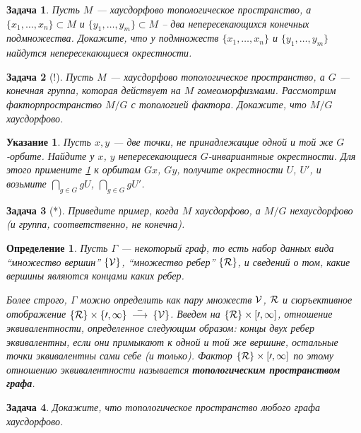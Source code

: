\documentclass[12pt]{book}
\newcommand{\arrow}{{\:\longrightarrow\:}}
\theoremstyle{upshape}
\newtheorem{zadacha}{Задача}[chapter]
\theoremstyle{generic}
\newtheorem{opredelenie}[teorema]{Определение}
\theoremstyle{upshapenonumber}
\newtheorem{ukazanie}{Указание}[section]
\newcommand{\следствие}{%
     \refstepcounter{teorema}
     {\noindent\bf Следствие \thechapter.\arabic{teorema}:\ }}
\newcommand{\пример}{%
     \refstepcounter{teorema}
     {\noindent\bf Пример \thechapter.\arabic{teorema}:\ }}
\newcommand{\лемма}{%
     \refstepcounter{teorema}
     {\noindent\bf Лемма \thechapter.\arabic{teorema}:\ }}
\newcommand{\теорема}{%
     \refstepcounter{teorema}
     {\noindent\bf Теорема \thechapter.\arabic{teorema}:\ }}
\newcommand{\утверждение}{%
     \refstepcounter{teorema}
     {\noindent\bf Утверждение \thechapter.\arabic{teorema}:\ }}
\begin{document}
{\begin{zadacha}\label{_hausdo_kone_Zadacha_}
Пусть $M$ --- хаусдорфово топологическое пространство,
а $\{x_1, \dots, x_n\} \subset M$ и $\{y_1, \dots, y_m\} \subset M$ 
-- два непересекающихся конечных подмножества. Докажите, что у 
подмножеств $\{x_1, \dots, x_n\}$ и  $\{y_1,\dots, y_m\}$ найдутся
непересекающиеся
окрестности. 
\end{zadacha}

\begin{zadacha}[!]
Пусть $M$ --- хаусдорфово  топологическое пространство, а 
$G$ --- конечная группа, которая действует на $M$
гомеоморфизмами. Рассмотрим
факторпространство $M/G$ с топологией
фактора. Докажите, что $M/G$ хаусдорфово.
\end{zadacha}

\begin{ukazanie}
Пусть $x,y$ --- две точки, не принадлежащие
одной и той же $G$-орбите. Найдите у $x$, $y$
непересекающиеся $G$-инвариантные окрестности. Для этого
примените \ref{_hausdo_kone_Zadacha_} к орбитам
$Gx$, $Gy$, получите окрестности $U$, $U'$,
и возьмите $\bigcap_{g\in G} gU$, $\bigcap_{g\in G} gU'$.
\end{ukazanie}

\begin{zadacha}[*]
Приведите пример,
когда $M$ хаусдорфово, а $M/G$ 
нехаусдорфово (и группа, соответственно, не конечна).
\end{zadacha}

\begin{opredelenie}
Пусть $\Gamma$ --- некоторый граф, то есть
набор данных вида ``множество вершин'' $\{\cal V\}$,
``множество ребер'' $\{\cal R\}$, и сведений о том,
какие вершины являются концами каких ребер.
\begin{center}
\end{center}
Более строго, $\Gamma$ можно определить как пару множеств
${\cal V}$, $\cal R$ и сюръективное отображение
$\{\cal R\}\times\{0,1\} \stackrel\Gamma\arrow \{\cal V\}$. 
Введем на $\{\cal R\}\times [0,1]$,
отношение эквивалентности, определенное следующим
образом: концы двух ребер эквивалентны, если они примыкают
к одной и той же вершине, остальные точки 
эквивалентны сами себе (и только).
Фактор  $\{\cal R\}\times [0,1]$ по этому
отношению эквивалентности называется
{\bf топологическим пространством графа}. 
\end{opredelenie}

\begin{zadacha}
Докажите, что топологическое пространство любого
графа хаусдорфово.
\end{zadacha}

}
\end{document}
